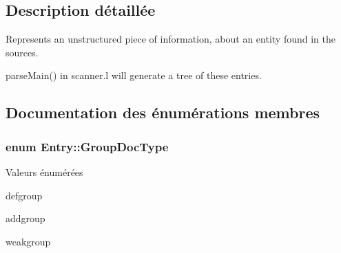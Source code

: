 \subsection{Description détaillée}
Represents an unstructured piece of information, about an entity found in the sources.

parse\+Main() in scanner.\+l will generate a tree of these entries. 

\subsection{Documentation des énumérations membres}
\hypertarget{class_entry_a470b655d0d6179559a11a81e6617d509}{}
\subsubsection[{Group\+Doc\+Type}]{\setlength{\rightskip}{0pt plus 5cm}enum {\bf Entry\+::\+Group\+Doc\+Type}}\label{class_entry_a470b655d0d6179559a11a81e6617d509}
\begin{Desc}
\item[Valeurs énumérées]\par
\begin{description}
\item[{\em 
\hypertarget{class_entry_a470b655d0d6179559a11a81e6617d509af6812be32a740baaad470ce4aec182be}{}G\+R\+O\+U\+P\+D\+O\+C\+\_\+\+N\+O\+R\+M\+A\+L\label{class_entry_a470b655d0d6179559a11a81e6617d509af6812be32a740baaad470ce4aec182be}
}]defgroup \item[{\em 
\hypertarget{class_entry_a470b655d0d6179559a11a81e6617d509a7637daf4200f6f55374604f2384ac925}{}G\+R\+O\+U\+P\+D\+O\+C\+\_\+\+A\+D\+D\label{class_entry_a470b655d0d6179559a11a81e6617d509a7637daf4200f6f55374604f2384ac925}
}]addgroup \item[{\em 
\hypertarget{class_entry_a470b655d0d6179559a11a81e6617d509a4231a193e86f3b43e9b1b6fe12f64ed0}{}G\+R\+O\+U\+P\+D\+O\+C\+\_\+\+W\+E\+A\+K\label{class_entry_a470b655d0d6179559a11a81e6617d509a4231a193e86f3b43e9b1b6fe12f64ed0}
}]weakgroup \end{description}
\end{Desc}
\hypertarget{class_entry_a1e615d53eb7db6d16c19fcb5788fbd9e}{}
